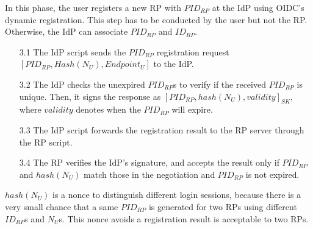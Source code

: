 In this phase, the user registers a new RP with $PID_{RP}$ at the IdP using OIDC's dynamic registration. This step has to be conducted by the user but not the RP. Otherwise, the IdP can associate $PID_{RP}$ and $ID_{RP}$.
\vspace{-\topsep}
\begin{itemize}
\item[3.1] The IdP script sends the $PID_{RP}$ registration request $[PID_{RP}, Hash( N_U), Endpoint_U]$ to the IdP.
\vspace{-\topsep}
\item[3.2] The IdP checks the unexpired $PID_{RP}$s to verify if the received $PID_{RP}$ is unique. Then, it signs the response as $[PID_{RP}, hash( N_U), validity]_{SK}$, where $validity$ denotes when the $PID_{RP}$ will expire.
\vspace{-\topsep}
\item[3.3] The IdP script forwards the registration result to the RP server through the RP script.
\vspace{-\topsep}
\item[3.4] The RP verifies the IdP's signature, and accepts the result only if $PID_{RP}$ and $hash(N_U)$ match those in the negotiation and $PID_{RP}$ is not expired.
\end{itemize}
\vspace{-\topsep}
$hash(N_U)$ is a nonce to distinguish different login sessions, because there is a very small chance that a same $PID_{RP}$ is generated for two RPs using different $ID_{RP}$s and $N_U$s. This nonce avoids a registration result is acceptable to two RPs.

